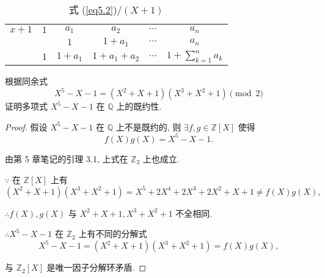 \documentclass[color=black,device=normal,lang=cn,mode=geye]{elegantnote}
\begin{document}
\begin{table}\caption{式 (\ref{eq5.2})$/(X+1)$}\label{tb2}
    \centering
    \begin{tabular}{c|ccccc}
        $x+1$             & $1$ & $a_1$   & $a_2$         & $\cdots$ & $a_n$ \\
                            &     & $1$     & $1+a_1$       & $\cdots$ & $a_n$ \\
        \cline{2-6}
        \multicolumn{2}{r}{$1$} & $1+a_1$ & $1+a_1+a_2$   & $\cdots$ & $1+\sum\limits_{k=1}^na_k$
    \end{tabular}
\end{table}
\begin{exercise}%
    根据同余式
    \[X^5-X-1=(X^2+X+1)(X^3+X^2+1)\pmod{2}\]
    证明多项式 $X^5-X-1$ 在 $\mathbb{Q}$ 上的既约性.
\end{exercise}
\begin{proof}
    假设 $X^5-X-1$ 在 $\mathbb{Q}$ 上不是既约的, 则 $\exists f,g\in\mathbb{Z}[X]$ 使得
    \[f(X)g(X)=X^5-X-1.\]

    由第 5 章笔记的引理 3.1, 上式在 $\mathbb{Z}_2$ 上也成立.
    
    $\because$ 在 $\mathbb{Z}[X]$ 上有
    \[(X^2+X+1)(X^3+X^2+1)=X^5+2X^4+2X^3+2X^2+X+1\neq f(X)g(X),\]

    $\therefore f(X),g(X)$ 与 $X^2+X+1,X^3+X^2+1$ 不全相同.

    $\therefore X^5-X-1$ 在 $\mathbb{Z}_2$ 上有不同的分解式
    \[X^5-X-1=(X^2+X+1)(X^3+X^2+1)=f(X)g(X),\]

    与 $\mathbb{Z}_2[X]$ 是唯一因子分解环矛盾.
\end{proof}
\end{document}
